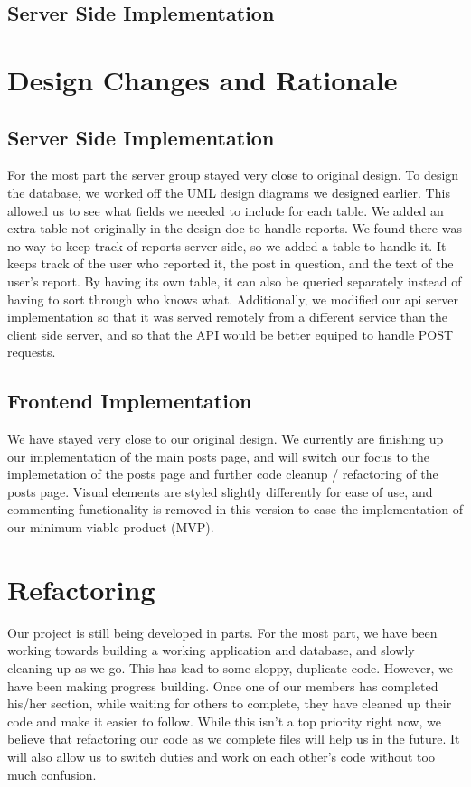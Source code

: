 \documentclass[12pt]{article}
\begin{document}
\subsection{Server Side Implementation}

\section{Design Changes and Rationale}
\subsection{Server Side Implementation}
For the most part the server group stayed very close to original design.  To
design the database, we worked off the UML design diagrams we designed earlier.
This allowed us to see what fields we needed to include for each table.  We
added an extra table not originally in the design doc to handle reports.  We
found there was no way to keep track of reports server side, so we added a table
to handle it.  It keeps track of the user who reported it, the post in question,
and the text of the user’s report.  By having its own table, it can also be
queried separately instead of having to sort through who knows what.
Additionally, we modified our api server implementation so that it was served
remotely from a different service than the client side server, and so that the
API would be better equiped to handle POST requests.
\subsection{Frontend Implementation}
We have stayed very close to our original design. We currently are finishing up
our implementation of the main posts page, and will switch our focus to the
implemetation of the posts page and further code cleanup / refactoring of the
posts page. Visual elements are styled slightly differently for ease of use, and
commenting functionality is removed in this version to ease the implementation
of our minimum viable product (MVP).

\section{Refactoring}

Our project is still being developed in parts. For the most part, we have
been working towards building a working application and database, and slowly
cleaning up as we go. This has lead to some sloppy, duplicate code. However,
we have been making progress building. Once one of our members has completed
his/her section, while waiting for others to complete, they have cleaned up
their code and make it easier to follow. While this isn’t a top priority
right now, we believe that refactoring our code as we complete files will
help us in the future. It will also allow us to switch duties and work on
each other's code without too much confusion.
\end{document}
